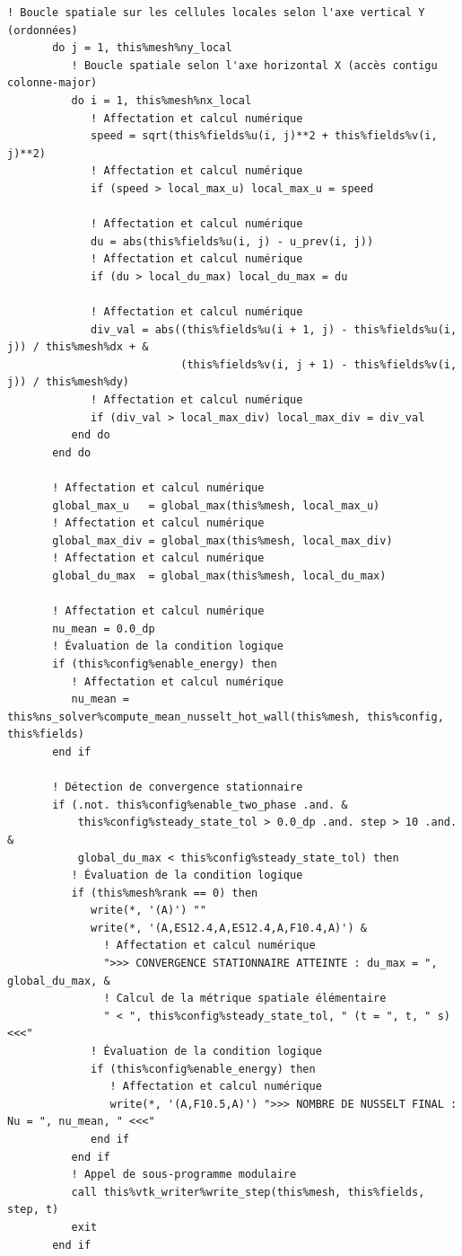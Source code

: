 \documentclass[10pt,a4paper,oneside]{book}
\begin{document}
\begin{lstlisting}[language={[95]Fortran}]
       ! Boucle spatiale sur les cellules locales selon l'axe vertical Y (ordonnées)
       do j = 1, this%mesh%ny_local
          ! Boucle spatiale selon l'axe horizontal X (accès contigu colonne-major)
          do i = 1, this%mesh%nx_local
             ! Affectation et calcul numérique
             speed = sqrt(this%fields%u(i, j)**2 + this%fields%v(i, j)**2)
             ! Affectation et calcul numérique
             if (speed > local_max_u) local_max_u = speed

             ! Affectation et calcul numérique
             du = abs(this%fields%u(i, j) - u_prev(i, j))
             ! Affectation et calcul numérique
             if (du > local_du_max) local_du_max = du

             ! Affectation et calcul numérique
             div_val = abs((this%fields%u(i + 1, j) - this%fields%u(i, j)) / this%mesh%dx + &
                           (this%fields%v(i, j + 1) - this%fields%v(i, j)) / this%mesh%dy)
             ! Affectation et calcul numérique
             if (div_val > local_max_div) local_max_div = div_val
          end do
       end do

       ! Affectation et calcul numérique
       global_max_u   = global_max(this%mesh, local_max_u)
       ! Affectation et calcul numérique
       global_max_div = global_max(this%mesh, local_max_div)
       ! Affectation et calcul numérique
       global_du_max  = global_max(this%mesh, local_du_max)

       ! Affectation et calcul numérique
       nu_mean = 0.0_dp
       ! Évaluation de la condition logique
       if (this%config%enable_energy) then
          ! Affectation et calcul numérique
          nu_mean = this%ns_solver%compute_mean_nusselt_hot_wall(this%mesh, this%config, this%fields)
       end if

       ! Détection de convergence stationnaire
       if (.not. this%config%enable_two_phase .and. &
           this%config%steady_state_tol > 0.0_dp .and. step > 10 .and. &
           global_du_max < this%config%steady_state_tol) then
          ! Évaluation de la condition logique
          if (this%mesh%rank == 0) then
             write(*, '(A)') ""
             write(*, '(A,ES12.4,A,ES12.4,A,F10.4,A)') &
               ! Affectation et calcul numérique
               ">>> CONVERGENCE STATIONNAIRE ATTEINTE : du_max = ", global_du_max, &
               ! Calcul de la métrique spatiale élémentaire
               " < ", this%config%steady_state_tol, " (t = ", t, " s) <<<"
             ! Évaluation de la condition logique
             if (this%config%enable_energy) then
                ! Affectation et calcul numérique
                write(*, '(A,F10.5,A)') ">>> NOMBRE DE NUSSELT FINAL : Nu = ", nu_mean, " <<<"
             end if
          end if
          ! Appel de sous-programme modulaire
          call this%vtk_writer%write_step(this%mesh, this%fields, step, t)
          exit
       end if


\end{lstlisting}
\end{document}
